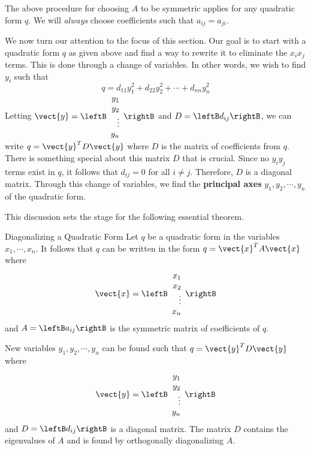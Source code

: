 The above procedure for choosing $A$ to be symmetric applies for any quadratic form $q$. We will \textit{always} choose coefficients such that $a_{ij}=a_{ji}$. 

We now turn our attention to the focus of this section. Our goal is to start with a quadratic form $q$ as given above and find a way to rewrite it to eliminate the $x_ix_j$ terms. This is done through a change of variables. In other words, we wish to find $y_i$ such that 
\[
q = d_{11}y_1^2 + d_{22}y_2^2 + \cdots + d_{nn}y_n^2
\]
 Letting $\vect{y} = \leftB
\begin{array}{r}
y_1 \\
y_2 \\
\vdots \\
y_n
\end{array}
\rightB$ and $D = \leftB d_{ij} \rightB$, we can write $q = \vect{y}^T D \vect{y}$ where $D$ is the matrix of coefficients from $q$. There is something special about this matrix $D$ that is crucial. Since no $y_iy_j$ terms exist in $q$, it follows that $d_{ij} = 0$ for all $i \neq j$. Therefore, $D$ is a diagonal matrix. Through this change of variables, we find the \textbf{principal axes} $y_1, y_2, \cdots, y_n$ of the quadratic form. 

This discussion sets the stage for the following essential theorem.

\begin{theorem}{Diagonalizing a Quadratic Form}\label{thm:diagquadraticform}
Let $q$ be a quadratic form in the variables $x_1, \cdots, x_n$. It follows that $q$ can be written in the form $q = \vect{x}^T A \vect{x}$ where 
\[
\vect{x} = \leftB \begin{array}{r}
x_1 \\
x_2 \\
\vdots \\
x_n
\end{array} \rightB 
\]
and $A = \leftB a_{ij} \rightB$ is the symmetric matrix of coefficients of $q$. 

New variables $y_1, y_2, \cdots, y_n$ can be found such that $q = \vect{y}^T D \vect{y}$ where 
\[
\vect{y} = \leftB \begin{array}{r} 
y_1 \\
y_2 \\
\vdots \\
y_n
\end{array} \rightB \] and $D=\leftB d_{ij} \rightB$ is a diagonal matrix. The matrix $D$ contains the eigenvalues of $A$ and is found by orthogonally diagonalizing $A$. 
\end{theorem}

